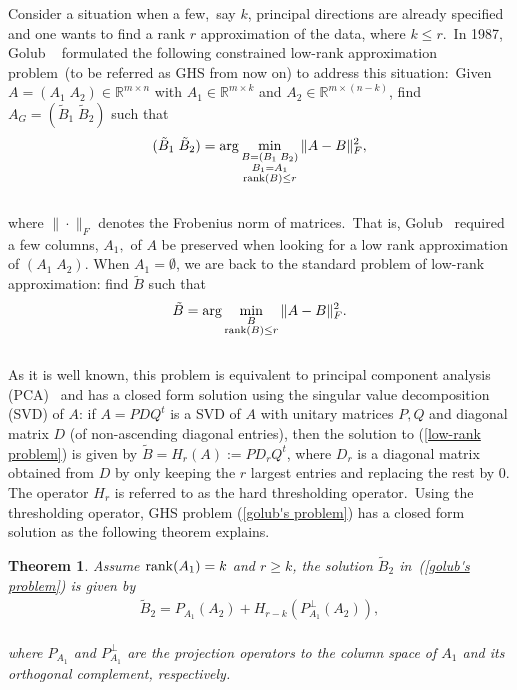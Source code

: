 \documentclass[10pt,twocolumn,letterpaper]{article}
\newtheorem{theorem}{Theorem}
\begin{document}
Consider a situation when a few,~say $k$, principal directions are
already specified and one wants to find a rank $r$ approximation of
the data, where $k\le r$.~In 1987, Golub \etal~\cite{golub}
formulated the following constrained low-rank approximation problem~(to be referred as GHS from now on) to address this
situation:~Given $A=(A_1\;A_2)\in\mathbb{R}^{m\times n}$ with
$A_1\in\mathbb{R}^{m\times k}$ and $A_2\in\mathbb{R}^{m\times
(n-k)}$, find $A_G=(\tilde{B}_1\;\tilde{B}_2)$ such that
~\\[-0.2in]
\begin{eqnarray}
(\tilde{B}_1\;\tilde{B}_2)=\arg\min_{\substack{B=(B_1\;B_2)\\B_1=A_1\\{\rm rank}(B)\le r}}\|A-B\|_F^2,\label{golub's problem}
\end{eqnarray}
~\\[-0.12in]
where $\|\cdot\|_F$ denotes the Frobenius norm of matrices.~That is, Golub \etal~required a few columns, $A_1,$ of $A$ be preserved when looking for a low rank approximation of $(A_1\;A_2).$
When $A_1=\emptyset$, we are back to the standard problem of low-rank approximation: find $\tilde{B}$ such that
~\\[-0.2in]
\begin{eqnarray}
\tilde{B}=\arg\min_{\substack{B\\{\rm rank}(B)\le r}}\|A-B\|_F^2.\label{low-rank problem}
\end{eqnarray}
~\\[-0.12in]
As it is well known, this problem is equivalent to principal component analysis (PCA)~\cite{pca} and has a closed form solution using the singular value decomposition (SVD) of $A$: if $A=PDQ^t$ is a SVD of $A$ with unitary matrices $P,Q$ and diagonal matrix $D$ (of non-ascending diagonal entries), then the solution to (\ref{low-rank problem}) is given by $\tilde{B}=H_r(A):=PD_rQ^t$, where $D_r$ is a diagonal matrix obtained from $D$ by only keeping the $r$ largest entries and replacing the rest by $0$. The operator $H_r$ is referred to as the hard thresholding operator.~Using the
thresholding operator, GHS problem (\ref{golub's problem}) has a
closed form solution as the following theorem explains.
~\\[-0.2in]
\begin{theorem}
\label{theorem 1}\cite{golub}
 Assume ${\rm rank}(A_1)=k$ and $r\ge k$, the solution $\tilde{B}_2$ in~(\ref{golub's problem}) is given by
 ~\\[-0.2in]
    \begin{align}\label{ghs}
    \tilde{B}_2= P_{A_1}(A_2)+H_{r-k}\left(P^{\perp}_{A_1}(A_2)\right),
    \end{align}
    ~\\[-0.2in]
    where $P_{A_1}$ and $P^\perp_{A_1}$ are the projection operators to the column space of $A_1$ and its orthogonal complement, respectively.
\end{theorem}
\end{document}
